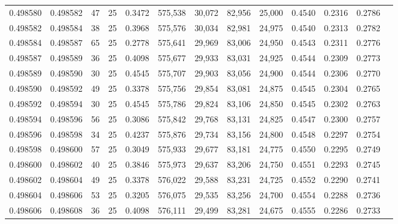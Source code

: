 \begin{tabular}{rrrrrrrrrrrrr}
0.498580 & 0.498582 &    47 &  25 &                                     0.3472 & 575,538 &  30,072 &  82,956 &  25,000 & 0.4540 & 0.2316 & 0.2786 \\
0.498582 & 0.498584 &    38 &  25 &                                     0.3968 & 575,576 &  30,034 &  82,981 &  24,975 & 0.4540 & 0.2313 & 0.2782 \\
0.498584 & 0.498587 &    65 &  25 &                                     0.2778 & 575,641 &  29,969 &  83,006 &  24,950 & 0.4543 & 0.2311 & 0.2776 \\
0.498587 & 0.498589 &    36 &  25 &                                     0.4098 & 575,677 &  29,933 &  83,031 &  24,925 & 0.4544 & 0.2309 & 0.2773 \\
0.498589 & 0.498590 &    30 &  25 &                                     0.4545 & 575,707 &  29,903 &  83,056 &  24,900 & 0.4544 & 0.2306 & 0.2770 \\
0.498590 & 0.498592 &    49 &  25 &                                     0.3378 & 575,756 &  29,854 &  83,081 &  24,875 & 0.4545 & 0.2304 & 0.2765 \\
0.498592 & 0.498594 &    30 &  25 &                                     0.4545 & 575,786 &  29,824 &  83,106 &  24,850 & 0.4545 & 0.2302 & 0.2763 \\
0.498594 & 0.498596 &    56 &  25 &                                     0.3086 & 575,842 &  29,768 &  83,131 &  24,825 & 0.4547 & 0.2300 & 0.2757 \\
0.498596 & 0.498598 &    34 &  25 &                                     0.4237 & 575,876 &  29,734 &  83,156 &  24,800 & 0.4548 & 0.2297 & 0.2754 \\
0.498598 & 0.498600 &    57 &  25 &                                     0.3049 & 575,933 &  29,677 &  83,181 &  24,775 & 0.4550 & 0.2295 & 0.2749 \\
0.498600 & 0.498602 &    40 &  25 &                                     0.3846 & 575,973 &  29,637 &  83,206 &  24,750 & 0.4551 & 0.2293 & 0.2745 \\
0.498602 & 0.498604 &    49 &  25 &                                     0.3378 & 576,022 &  29,588 &  83,231 &  24,725 & 0.4552 & 0.2290 & 0.2741 \\
0.498604 & 0.498606 &    53 &  25 &                                     0.3205 & 576,075 &  29,535 &  83,256 &  24,700 & 0.4554 & 0.2288 & 0.2736 \\
0.498606 & 0.498608 &    36 &  25 &                                     0.4098 & 576,111 &  29,499 &  83,281 &  24,675 & 0.4555 & 0.2286 & 0.2733 \\

\end{tabular}
